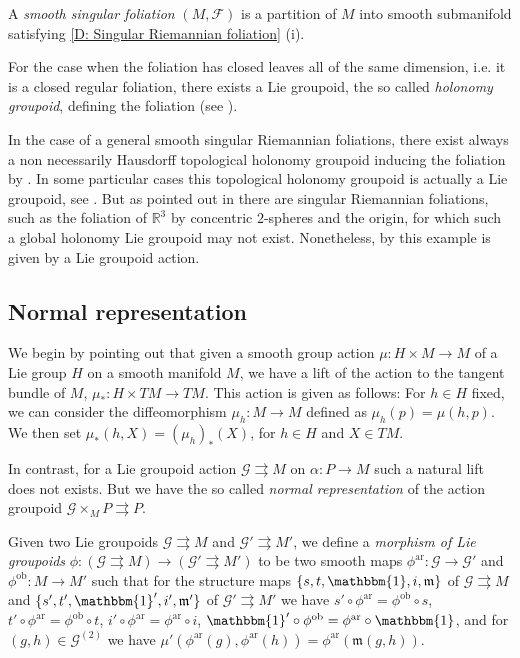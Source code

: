\documentclass[12pt,a4paper,reqno]{amsart}
\newcommand{\1}{\mathbbm{1}} %
\newcommand{\ar}{\mathrm{ar}}
\newcommand{\fol}{\mathcal{F}} %
\newcommand{\G}{\mathcal{G}} %
\newcommand{\m}{\mathfrak{m}} %
\newcommand{\ob}{\mathrm{ob}}
\newcommand{\R}{\mathbb{R}} %
\theoremstyle{definition}
\theoremstyle{TheoremNum}
\begin{document}
A \emph{smooth singular foliation} $(M,\fol)$ is a partition of $M$ into smooth submanifold satisfying \th\ref{D: Singular Riemannian foliation} (i). 

For the case when the foliation has closed leaves all of the same dimension, i.e. it is a closed regular foliation, there exists a Lie groupoid, the so called \emph{holonomy groupoid}, defining the foliation (see \cite{Ehresmann1965} \cite{Winkelnkemper1983}). 

In the case of a general smooth singular Riemannian foliations, there exist always a non necessarily Hausdorff topological holonomy groupoid inducing the foliation by \cite[Theorem 0.1]{AndroulidakisSkandalis2009}. In some particular cases this topological holonomy groupoid is actually a Lie groupoid, see \cite{Debord2001}. But as pointed out in \cite[p. 496, Examples 3.]{Debord2001} there are singular Riemannian foliations, such as the foliation of $\R^3$ by concentric $2$-spheres and the origin, for which such a global holonomy Lie groupoid may not exist. Nonetheless, by \cite{AlexandrinoInagakiStruchiner2018} this example is given by a Lie groupoid action. 

\subsection{Normal representation} We begin by pointing out that given a smooth group action $\mu\colon H\times M\to M$ of a Lie group $H$ on a smooth manifold $M$, we have a lift of the action to the tangent bundle of $M$, $\mu_\ast\colon H\times TM\to TM$. This action is given as follows: For $h\in H$ fixed, we can consider the diffeomorphism $\mu_h\colon M\to M$ defined as $\mu_h(p) = \mu(h,p)$. We then set $\mu_\ast(h,X) = (\mu_h)_\ast (X)$, for $h\in H$ and $X\in TM$. 

In contrast, for a Lie groupoid action $\G\rightrightarrows M$ on $\alpha\colon P\to M$ such a natural lift does not exists. But we have the so called \emph{normal representation} of the action groupoid $\G\times_M P \rightrightarrows P$.

Given two Lie groupoids $\G\rightrightarrows M$ and $\G'\rightrightarrows M'$, we define a \emph{morphism of Lie groupoids} $\phi\colon (\G\rightrightarrows M)\to (\G'\rightrightarrows M')$ to be two smooth maps $\phi^{\ar}\colon \G\to \G'$ and $\phi^{\ob}\colon M\to M'$ such that for the structure maps $\{s,t,\1,i,\m\}$ of $\G\rightrightarrows M$ and $\{s',t',\1',i',\m'\}$ of $\G'\rightrightarrows M'$ we have $s'\circ \phi^{\ar} = \phi^{\ob}\circ s$, $t'\circ \phi^{\ar} = \phi^{\ob}\circ t$, $i'\circ \phi^{\ar} = \phi^{\ar}\circ i$, $\1'\circ\phi^{\ob} = \phi^{\ar}\circ \1$, and for $(g,h)\in \G^{(2)}$ we have $\mu'(\phi^{\ar}(g),\phi^{\ar}(h)) = \phi^{\ar}(\m(g,h))$.
\end{document}
